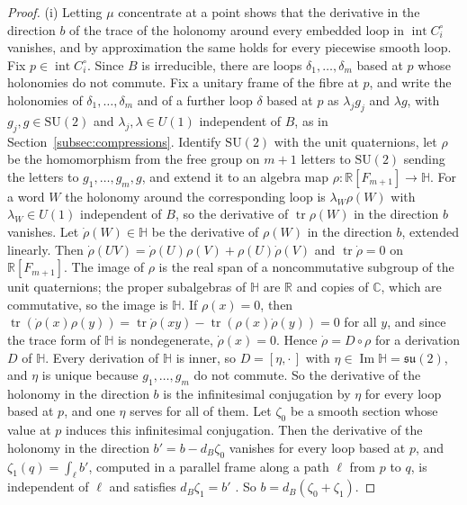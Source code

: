\documentclass[11pt]{amsart}
\theoremstyle{definition}
\theoremstyle{remark}
\theoremstyle{plain}
\numberwithin{equation}{section}
\newcommand{\RR}{\mathbb{R}}
\newcommand{\CC}{\mathbb{C}}
\newcommand{\tr}{\operatorname{tr}}
\newcommand{\SU}{\mathrm{SU}}
\begin{document}
\begin{proof}
(i) Letting $\mu$ concentrate at a point shows that the derivative in the direction $b$ of the
trace of the holonomy around every embedded loop in $\operatorname{int}C_i^\circ$ vanishes, and by
approximation \cite[p.~141]{Donaldson-book} the same holds for every piecewise smooth loop. Fix
$p\in\operatorname{int}C_i^\circ$. Since $B$ is irreducible, there are loops $\delta_1,\dots,\delta_m$
based at $p$ whose holonomies do not commute. Fix a unitary frame of the fibre at $p$, and write
the holonomies of $\delta_1,\dots,\delta_m$ and of a further loop $\delta$ based at $p$ as
$\lambda_jg_j$ and $\lambda g$, with $g_j,g\in\SU(2)$ and $\lambda_j,\lambda\in U(1)$ independent of
$B$, as in Section~\ref{subsec:compressions}. Identify $\SU(2)$ with the unit quaternions, let
$\rho$ be the homomorphism from the free group on $m+1$ letters to $\SU(2)$ sending the letters
to $g_1,\dots,g_m,g$, and extend it to an algebra map $\rho\colon\RR[F_{m+1}]\to\mathbb H$. For a
word $W$ the holonomy around the corresponding loop is $\lambda_W\rho(W)$ with $\lambda_W\in U(1)$
independent of $B$, so the derivative of $\tr\rho(W)$ in the direction $b$ vanishes. Let
$\dot\rho(W)\in\mathbb H$ be the derivative of $\rho(W)$ in the direction $b$, extended linearly.
Then $\dot\rho(UV)=\dot\rho(U)\rho(V)+\rho(U)\dot\rho(V)$ and $\tr\dot\rho=0$ on
$\RR[F_{m+1}]$. The image of $\rho$ is the real span of a noncommutative subgroup of the unit
quaternions; the proper subalgebras of $\mathbb H$ are $\RR$ and copies of $\CC$, which are
commutative, so the image is $\mathbb H$. If $\rho(x)=0$, then
$\tr(\dot\rho(x)\rho(y))=\tr\dot\rho(xy)-\tr(\rho(x)\dot\rho(y))=0$ for all $y$, and since the
trace form of $\mathbb H$ is nondegenerate, $\dot\rho(x)=0$. Hence $\dot\rho=D\circ\rho$ for a
derivation $D$ of $\mathbb H$. Every derivation of $\mathbb H$ is inner, so
$D=[\eta,\cdot\,]$ with $\eta\in\operatorname{Im}\mathbb H=\mathfrak{su}(2)$, and $\eta$ is
unique because $g_1,\dots,g_m$ do not commute. So the derivative of the holonomy in the direction
$b$ is the infinitesimal conjugation by $\eta$ for every loop based at $p$, and one $\eta$ serves
for all of them. Let $\zeta_0$ be a smooth section whose value at $p$ induces this infinitesimal
conjugation. Then the derivative of the holonomy in the direction $b'=b-d_B\zeta_0$ vanishes for
every loop based at $p$, and $\zeta_1(q)=\int_\ell b'$, computed in a parallel frame along a path
$\ell$ from $p$ to $q$, is independent of $\ell$ and satisfies $d_B\zeta_1=b'$
\cite[(6.4)]{DFL}. So $b=d_B(\zeta_0+\zeta_1)$.


\end{proof}
\end{document}
